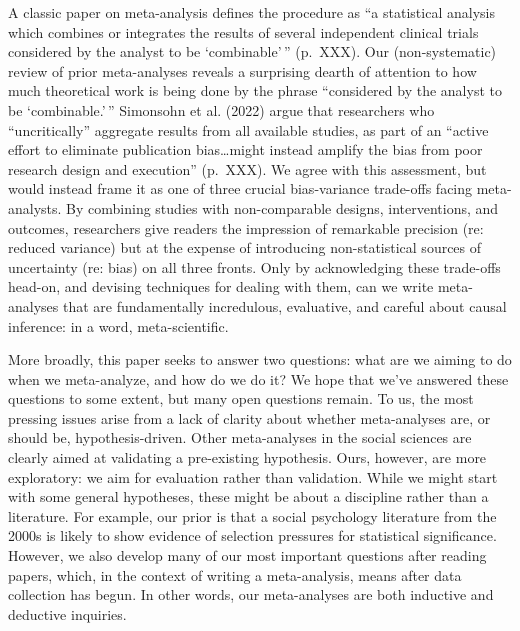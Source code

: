 \documentclass[
  ,jou]{apa6}
\begin{document}
A classic paper on meta-analysis defines the procedure as ``a statistical analysis which combines or integrates the results of several independent clinical trials considered by the analyst to be `combinable'\,'' (p.~XXX). Our (non-systematic) review of prior meta-analyses reveals a surprising dearth of attention to how much theoretical work is being done by the phrase ``considered by the analyst to be `combinable.'\,'' Simonsohn et al. (2022) argue that researchers who ``uncritically'' aggregate results from all available studies, as part of an ``active effort to eliminate publication bias\ldots might instead amplify the bias from poor research design and execution'' (p.~XXX). We agree with this assessment, but would instead frame it as one of three crucial bias-variance trade-offs facing meta-analysts. By combining studies with non-comparable designs, interventions, and outcomes, researchers give readers the impression of remarkable precision (re: reduced variance) but at the expense of introducing non-statistical sources of uncertainty (re: bias) on all three fronts. Only by acknowledging these trade-offs head-on, and devising techniques for dealing with them, can we write meta-analyses that are fundamentally incredulous, evaluative, and careful about causal inference: in a word, meta-scientific.

More broadly, this paper seeks to answer two questions: what are we aiming to do when we meta-analyze, and how do we do it? We hope that we've answered these questions to some extent, but many open questions remain. To us, the most pressing issues arise from a lack of clarity about whether meta-analyses are, or should be, hypothesis-driven. Other meta-analyses in the social sciences are clearly aimed at validating a pre-existing hypothesis. Ours, however, are more exploratory: we aim for evaluation rather than validation. While we might start with some general hypotheses, these might be about a discipline rather than a literature. For example, our prior is that a social psychology literature from the 2000s is likely to show evidence of selection pressures for statistical significance. However, we also develop many of our most important questions after reading papers, which, in the context of writing a meta-analysis, means after data collection has begun. In other words, our meta-analyses are both inductive and deductive inquiries.
\end{document}
